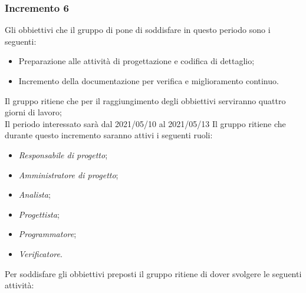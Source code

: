 \subsubsection{Incremento 6}
Gli obbiettivi che il gruppo di pone di soddisfare in questo periodo sono i seguenti:
\begin{itemize}
    \item Preparazione alle attività di progettazione e codifica di dettaglio;
    \item Incremento della documentazione per verifica e miglioramento continuo.
\end{itemize}
Il gruppo ritiene che per il raggiungimento degli obbiettivi serviranno quattro giorni di lavoro;\\
Il periodo interessato sarà dal 2021/05/10 al 2021/05/13
Il gruppo ritiene che durante questo incremento saranno attivi i seguenti ruoli:
\begin{itemize}
    \item \textit{Responsabile di progetto};
    \item \textit{Amministratore di progetto};
    \item \textit{Analista};
    \item \textit{Progettista};
    \item \textit{Programmatore};
    \item \textit{Verificatore}.
\end{itemize}
Per soddisfare gli obbiettivi preposti il gruppo ritiene di dover svolgere le seguenti attività:
